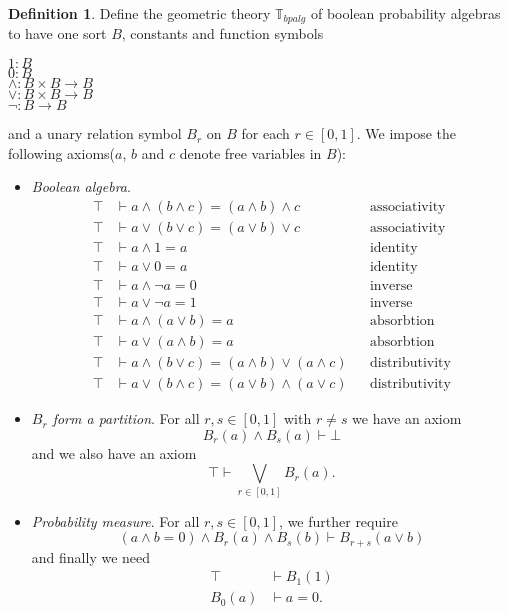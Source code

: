 \documentclass[a4paper]{amsproc}
\theoremstyle{plain}
\theoremstyle{definition}
\newtheorem{definition}[theorem]{Definition}
\theoremstyle{remark}
\numberwithin{equation}{section}
\begin{document}
\begin{definition}
Define the geometric theory $\mathbb{T}_{bpalg}$ of boolean probability algebras to have one sort $B$, constants and function symbols
\begin{center}
$1: B$ \\
$0: B$ \\
$\wedge: B \times B \to B$ \\
$\vee: B \times B \to B$ \\
$\neg: B \to B$
\end{center}
and a unary relation symbol $B_r$ on $B$ for each $r \in [0,1]$. We impose the following axioms($a$, $b$ and $c$ denote free variables in $B$):
\begin{itemize}
\item \textit{Boolean algebra}.
\begin{align*}
\top &\vdash a \wedge (b \wedge c) = (a \wedge b) \wedge c && \text{associativity} \\
\top &\vdash a \vee (b \vee c) = (a \vee b) \vee c && \text{associativity} \\
\top &\vdash a \wedge 1 = a && \text{identity} \\
\top &\vdash a \vee 0 = a && \text{identity}\\
\top &\vdash a \wedge \neg{a} = 0 && \text{inverse}\\
\top &\vdash a \vee \neg{a} = 1 && \text{inverse}\\
\top &\vdash a \wedge (a \vee b) = a && \text{absorbtion}\\
\top &\vdash a \vee (a \wedge b) = a && \text{absorbtion}\\
\top &\vdash a \wedge (b \vee c) = (a \wedge b) \vee (a \wedge c) && \text{distributivity} \\
\top &\vdash a \vee (b \wedge c) = (a \vee b) \wedge (a \vee c) && \text{distributivity}
\end{align*}
\item \textit{$B_r$ form a partition}. For all $r, s \in [0,1]$ with $r \neq s$ we have an axiom
\[
B_r(a)  \wedge B_s(a) \vdash \bot
\]
and we also have an axiom
\[
\top \vdash \bigvee_{r \in [0,1]} B_r(a).
\]
\item \textit{Probability measure}. For all $r, s \in [0,1]$, we further require
\[
(a \wedge b = 0) \wedge B_r(a) \wedge B_s(b) \vdash B_{r+s}(a \vee b)
\]
and finally we need
\begin{align*}
\top & \vdash B_1(1) \\
B_0(a) & \vdash a = 0.
\end{align*}
\end{itemize}
\end{definition}
\end{document}
